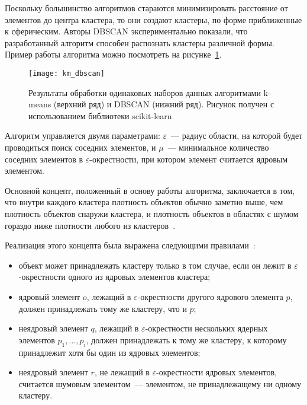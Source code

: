 Поскольку большинство алгоритмов стараются минимизировать расстояние от элементов до центра кластера, то они создают кластеры, по форме приближенные к сферическим. Авторы DBSCAN экспериментально показали, что разработанный алгоритм способен распознать кластеры различной формы. Пример работы алгоритма можно посмотреть на рисунке~\ref{pic:km-dbscan}.

\begin{figure}[ht!]
    \centering
    \texttt{[image: km\_dbscan]}\\[1ex]
    \parbox{.9\textwidth}{\caption{Результаты обработки одинаковых наборов данных алгоритмами k-means (верхний ряд) и DBSCAN (нижний ряд). Рисунок получен с использованием библиотеки scikit-learn~\cite{sklearn}} \label{pic:km-dbscan}}
\end{figure}

Алгоритм управляется двумя параметрами: \( \varepsilon \)~--- радиус области, на которой будет проводиться поиск соседних элементов, и \( \mu \)~--- минимальное количество соседних элементов в \( \varepsilon \)-окрестности, при котором элемент считается ядровым элементом.

Основной концепт, положенный в основу работы алгоритма, заключается в том, что внутри каждого кластера плотность объектов обычно заметно выше, чем плотность объектов снаружи кластера, и плотность объектов в областях с шумом гораздо ниже плотности любого из кластеров~\cite{dbscan-pos}.

Реализация этого концепта была выражена следующими правилами~\cite{cod}:
\begin{itemize}
    \item объект может принадлежать кластеру только в том случае, если он лежит в \( \varepsilon \)-окрестности одного из ядровых элементов кластера;
    \item ядровый элемент \( o \), лежащий в \( \varepsilon \)-окрестности другого ядрового элемента \( p \), должен принадлежать тому же кластеру, что и \( p \);
    \item неядровый элемент \( q \), лежащий в \( \varepsilon \)-окрестности нескольких ядерных элементов \( p_1, \ldots, p_i \), должен принадлежать к тому же кластеру, к которому принадлежит хотя бы один из ядровых элементов;
    \item неядровый элемент \( r \), не лежащий в \( \varepsilon \)-окрестности ядровых элементов, считается шумовым элементом~--- элементом, не принадлежащему ни одному кластеру.
\end{itemize}

